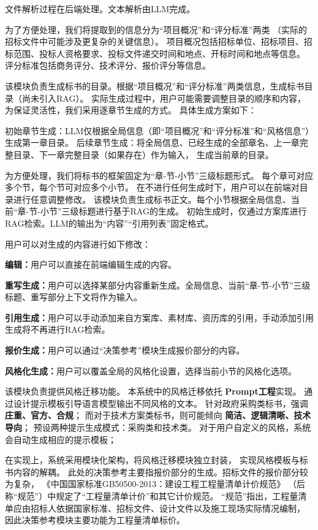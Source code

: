 \documentclass{xmu}
\begin{document}
文件解析过程在后端处理。文本解析由LLM完成。

为了方便处理，我们将提取到的信息分为“项目概况”和“评分标准”两类
（实际的招标文件中可能涉及更复杂的关键信息）。
项目概况包括招标单位、招标项目、招标范围、投标人资格要求、投标文件递交时间和地点、开标时间和地点等信息。
评分标准包括商务评分、技术评分、报价评分等信息。

该模块负责生成标书的目录。根据“项目概况”和“评分标准”两类信息，生成标书目录（尚未引入RAG）。
实际生成过程中，用户可能需要调整目录的顺序和内容，为保证灵活性，我们采用逐章节生成的方式。
具体生成方案如下：

初始章节生成：LLM仅根据全局信息（即“项目概况”和“评分标准”和“风格信息”）生成第一章目录。
后续章节生成：将全局信息、已经生成的全部章名、上一章完整目录、下一章完整目录（如果存在）作为输入，
生成当前章的目录。

为方便处理，我们将标书的框架固定为“章-节-小节”三级标题形式。
每个章可对应多个节，每个节可对应多个小节。
在不进行任何生成时下，用户可以在前端对目录进行任意调整修改。
该模块负责生成标书正文。每个小节根据全局信息、当前“章-节-小节”三级标题进行基于RAG的生成。
初始生成时，仅通过方案库进行RAG检索。LLM的输出为“内容”“引用列表”固定格式。

用户可以对生成的内容进行如下修改：

{\bf 编辑：}用户可以直接在前端编辑生成的内容。

{\bf 重写生成：}用户可以选择某部分内容重新生成。全局信息、当前“章-节-小节”三级标题、重写部分上下文将作为输入。

{\bf 引用生成：}用户可以手动添加来自方案库、素材库、资历库的引用，手动添加引用生成将不再进行RAG检索。

{\bf 报价生成：}用户可以通过“决策参考”模块生成报价部分的内容。

{\bf 风格化生成：}用户可以覆盖全局的风格化设置，选择当前小节的风格化选项。

该模块负责提供风格迁移功能。
本系统中的风格迁移依托 {\bf Prompt工程}实现。
通过设计提示模板引导语言模型输出不同风格的文本。
针对政府采购类标书，强调 {\bf 庄重、官方、合规}；
而对于技术方案类标书，则可能倾向 {\bf 简洁、逻辑清晰、技术导向}；
预设两种提示生成模式：采购类和技术类。
对于用户自定义的风格，系统会自动生成相应的提示模板；

在实现上，系统采用模块化架构，将风格迁移模块独立封装，
实现风格模板与标书内容的解耦。
此处的决策参考主要指报价部分的生成。招标文件的报价部分较为复杂，
《中国国家标准GB50500-2013：建设工程工程量清单计价规范》
（后称“规范”）中规定了“工程量清单计价”和其它计价规范。
“规范”指出，工程量清单应由招标人依据国家标准、招标文件、设计文件以及施工现场实际情况编制，
因此决策参考模块主要功能为工程量清单标价。
\end{document}
